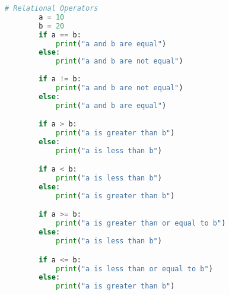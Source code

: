 \documentclass[11pt]{article}
\begin{document}
\begin{enumerate}
\begin{lstlisting}[language=Python]
		# Relational Operators
		a = 10
		b = 20
		if a == b:
			print("a and b are equal")
		else:
			print("a and b are not equal")
		
		if a != b:
			print("a and b are not equal")
		else:
			print("a and b are equal")	

		if a > b:
			print("a is greater than b")
		else:
			print("a is less than b")

		if a < b:
			print("a is less than b")
		else:
			print("a is greater than b")

		if a >= b:
			print("a is greater than or equal to b")
		else:
			print("a is less than b")

		if a <= b:
			print("a is less than or equal to b")
		else:
			print("a is greater than b")
	\end{lstlisting}

\end{enumerate}
\end{document}
